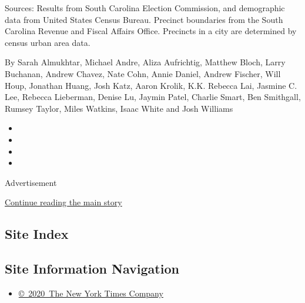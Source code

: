 Sources: Results from South Carolina Election Commission, and
demographic data from United States Census Bureau. Precinct boundaries
from the South Carolina Revenue and Fiscal Affairs Office. Precincts in
a city are determined by census urban area data.

By Sarah Almukhtar, Michael Andre, Aliza Aufrichtig, Matthew Bloch,
Larry Buchanan, Andrew Chavez, Nate Cohn, Annie Daniel, Andrew Fischer,
Will Houp, Jonathan Huang, Josh Katz, Aaron Krolik, K.K. Rebecca Lai,
Jasmine C. Lee, Rebecca Lieberman, Denise Lu, Jaymin Patel, Charlie
Smart, Ben Smithgall, Rumsey Taylor, Miles Watkins, Isaac White and Josh
Williams

\begin{itemize}
\item
\item
\item
\item
\end{itemize}

Advertisement

\protect\hyperlink{after-bottom}{Continue reading the main story}

\hypertarget{site-index}{%
\subsection{Site Index}\label{site-index}}

\hypertarget{site-information-navigation}{%
\subsection{Site Information
Navigation}\label{site-information-navigation}}

\begin{itemize}
\tightlist
\item
  \href{https://help.nytimes3xbfgragh.onion/hc/en-us/articles/115014792127-Copyright-notice}{©~2020~The
  New York Times Company}
\end{itemize}

